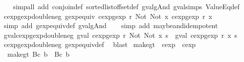 \begin{isabellebody}
\ \ \isamarkupfalse%
\ {\isacharparenleft}simp{\isacharunderscore}all\ add{\isacharcolon}\ conjoin{\isacharunderscore}def\ sorted{\isacharunderscore}list{\isacharunderscore}of{\isacharunderscore}fset{\isacharunderscore}def\ gval{\isacharunderscore}gAnd\ gval{\isachardot}simps\ ValueEq{\isacharunderscore}def{\isacharparenright}%
\endisatagproof
{\isafoldproof}%
%
\isadelimproof
\isanewline
%
\endisadelimproof
\isanewline
{}\isamarkupfalse%
\ cexp{}gexp{\isacharunderscore}double{\isacharunderscore}neg{\isacharcolon}\ {\isachardoublequoteopen}gexp{\isacharunderscore}equiv\ {\isacharparenleft}cexp{}gexp\ r\ {\isacharparenleft}Not\ {\isacharparenleft}Not\ x{\isacharparenright}{\isacharparenright}{\isacharparenright}\ {\isacharparenleft}cexp{}gexp\ r\ x{\isacharparenright}{\isachardoublequoteclose}\isanewline
%
\isadelimproof
\ \ %
\endisadelimproof
%
\isatagproof
{}\isamarkupfalse%
\ {\isacharparenleft}simp\ add{\isacharcolon}\ gexp{\isacharunderscore}equiv{\isacharunderscore}def\ gval{\isacharunderscore}gAnd{\isacharparenright}\isanewline
\ \ \isamarkupfalse%
\ {\isacharparenleft}simp\ add{\isacharcolon}\ maybe{\isacharunderscore}and{\isacharunderscore}idempotent{\isacharparenright}%
\endisatagproof
{\isafoldproof}%
%
\isadelimproof
\isanewline
%
\endisadelimproof
\isanewline
{}\isamarkupfalse%
\ gval{\isacharunderscore}cexp{}gexp{\isacharunderscore}double{\isacharunderscore}neg{\isacharcolon}\ {\isachardoublequoteopen}gval\ {\isacharparenleft}cexp{}gexp\ r\ {\isacharparenleft}Not\ {\isacharparenleft}Not\ x{\isacharparenright}{\isacharparenright}{\isacharparenright}\ s\ {\isacharequal}\ gval\ {\isacharparenleft}cexp{}gexp\ r\ x{\isacharparenright}\ s{\isachardoublequoteclose}\isanewline
%
\isadelimproof
\ \ %
\endisadelimproof
%
\isatagproof
{}\isamarkupfalse%
\ cexp{}gexp{\isacharunderscore}double{\isacharunderscore}neg\ gexp{\isacharunderscore}equiv{\isacharunderscore}def\ \isamarkupfalse%
\ blast%
\endisatagproof
{\isafoldproof}%
%
\isadelimproof
\isanewline
%
\endisadelimproof
\isanewline
{}\isamarkupfalse%
\ make{\isacharunderscore}gt\ {\isacharcolon}{\isacharcolon}\ {\isachardoublequoteopen}cexp\ {\isasymRightarrow}\ cexp{\isachardoublequoteclose}\ \isanewline
\ \ {\isachardoublequoteopen}make{\isacharunderscore}gt\ {\isacharparenleft}Bc\ b{\isacharparenright}\ {\isacharequal}\ Bc\ b{\isachardoublequoteclose}\ {\isacharbar}\isanewline

\end{isabellebody}
